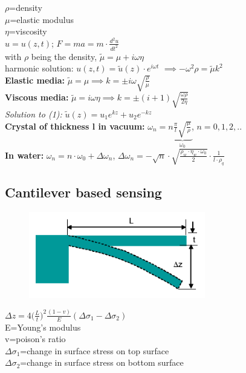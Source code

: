 \documentclass[9pt]{article}
\begin{document}
\begin{multicols}{2}
			$\rho$=density\\
			$\mu$=elastic modulus\\
			$\eta$=viscosity\\
$u=u(z,t)$; $F=ma=m\cdot \frac{d^2u}{dt^2}$
\\ with $\rho$ being the density, $\tilde \mu=\mu +i \omega \eta $\\
harmonic solution: $u(z,t)=\tilde u (z)\cdot  e^{i \omega t}$ $\implies -\omega ^2 \rho = \tilde \mu k^2$\\
\textbf{Elastic media:} $\tilde \mu= \mu \implies k=\pm i\omega \sqrt{\frac{\rho}{\mu}}$\\
\textbf{Viscous media:} $\tilde \mu= i\omega \eta \implies k=\pm (i+1) \sqrt{\frac{\omega \rho}{2 \eta}}$\\
\emph{Solution to (1):} $\tilde u (z)=u_1 e^{kz}+u_2 e^{-kz}$\\
\textbf{Crystal of thickness l in vacuum:} $\omega _n=n \underbrace{\frac{\pi}{l}\sqrt{\frac{\mu}{\rho}}}_{\omega _0}$, $n=0,1,2,..$\\
\textbf{In water:} $\omega _n =n\cdot \omega _0+\Delta \omega _n$, $\Delta \omega _n = -\sqrt{n}\cdot \sqrt{\frac{\rho _w \cdot \eta _w \cdot \omega _0}{2}}\cdot \frac{1}{l\cdot \rho _q}$
\subsection{Cantilever based sensing}
			\begin{figure}
			\vspace{-7mm}
			\includegraphics[width=0.9\linewidth]{Images/cantilever.png}
			\end{figure}
			$\Delta z=4\Big(\frac{L}{t}\Big)^2\frac{(1-v)}{E}(\Delta\sigma_1-\Delta\sigma_2)$\\
			E=Young's modulus\\
			v=poison's ratio\\
			$\Delta\sigma_1$=change in surface stress on top surface\\
			$\Delta\sigma_2$=change in surface stress on bottom surface\\

\end{multicols}
\end{document}
